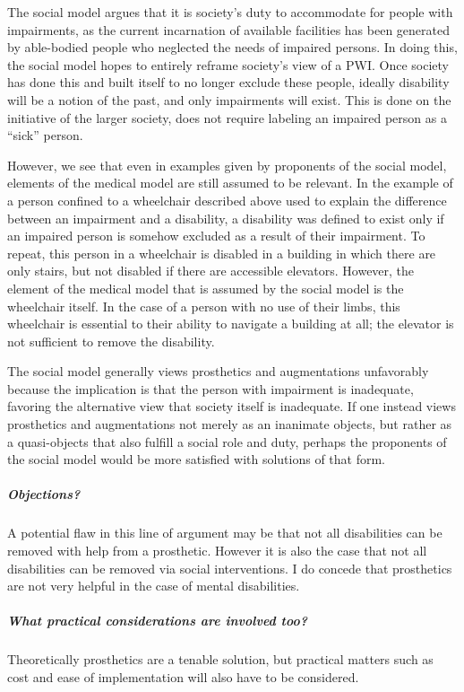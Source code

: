 \documentclass[a4paper]{article}
\begin{document}
The social model argues that it is society's duty to accommodate for people
with impairments, as the current incarnation of available facilities has been
generated by able-bodied people who neglected the needs of impaired persons.
In doing this, the social model hopes to entirely reframe society's view of a
PWI. Once society has done this and built itself to no longer exclude these
people, ideally disability will be a notion of the past, and only impairments
will exist. This is done on the initiative of the larger society, does not
require labeling an impaired person as a ``sick'' person.

However, we see that even in examples given by proponents of the social model,
elements of the medical model are still assumed to be relevant.  In the
example of a person confined to a wheelchair described above used to explain
the difference between an impairment and a disability, a disability was
defined to exist only if an impaired person is somehow excluded as a result of
their impairment. To repeat, this person in a wheelchair is disabled in a
building in which there are only stairs, but not disabled if there are
accessible elevators. However, the element of the medical model that is
assumed by the social model is the wheelchair itself. In the case of a person
with no use of their limbs, this wheelchair is essential to their ability
to navigate a building at all; the elevator is not sufficient to remove the
disability. 

The social model generally views prosthetics and augmentations unfavorably
because the implication is that the person with impairment is inadequate,
favoring the alternative view that society itself is inadequate.  If one
instead views prosthetics and augmentations not merely as an inanimate objects,
but rather as a quasi-objects that also fulfill a social role and duty, perhaps
the proponents of the social model would be more satisfied with solutions of
that form.

\subparagraph{Objections?}

A potential flaw in this line of argument may be that not all disabilities can
be removed with help from a prosthetic. However it is also the case that not
all disabilities can be removed via social interventions. I do concede that
prosthetics are not very helpful in the case of mental disabilities. 

\subparagraph{What practical considerations are involved too?}

Theoretically prosthetics are a tenable solution, but practical matters such as
cost and ease of implementation will also have to be considered.  
\end{document}
